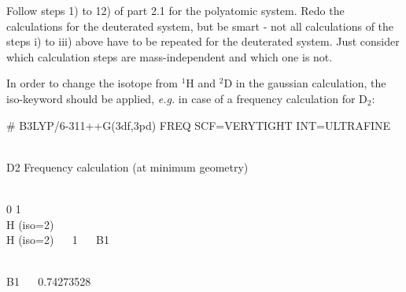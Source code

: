 \documentclass[
  letterpaper,
]{article}
\begin{document}
Follow steps 1) to 12) of part 2.1 for the polyatomic system. Redo the
calculations for the deuterated system, but be smart - not all
calculations of the steps i) to iii) above have to be repeated for the
deuterated system. Just consider which calculation steps are
mass-independent and which one is not.

In order to change the isotope from \(\mathrm{^1H}\) and
\(\mathrm{^2D}\) in the gaussian calculation, the iso-keyword should be
applied, \emph{e.g.} in case of a frequency calculation for
\(\mathrm{D_2}\):

\begin{tcolorbox}[enhanced jigsaw, toptitle=1mm, opacitybacktitle=0.6, colframe=quarto-callout-note-color-frame, toprule=.15mm, breakable, bottomrule=.15mm, left=2mm, title={Note}, titlerule=0mm, leftrule=.75mm, bottomtitle=1mm, coltitle=black, arc=.35mm, rightrule=.15mm, opacityback=0, colback=white, colbacktitle=quarto-callout-note-color!10!white]

\# B3LYP/6-311++G(3df,3pd) FREQ SCF=VERYTIGHT INT=ULTRAFINE\\
\strut \\
D2 Frequency calculation (at minimum geometry)\\
\strut \\
0 1\\
H { (iso=2)}\\
H { (iso=2)} ~~ 1 ~~ B1\\
\strut \\
B1 ~~ 0.74273528\\

\end{tcolorbox}
\end{document}
